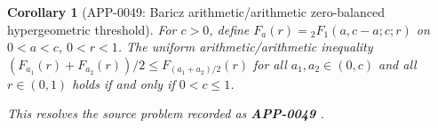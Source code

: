 \documentclass[11pt]{article}
\numberwithin{equation}{section}
\newtheorem{corollary}[theorem]{Corollary}
\theoremstyle{definition}
\theoremstyle{remark}
\newcommand{\1}{\mathbf 1}
\begin{document}
\begin{corollary}[APP-0049: Baricz arithmetic/arithmetic zero-balanced hypergeometric threshold]
\label{res:baricz-aa-zero-balanced-concavity-threshold}
For \(c>0\), define \(F_a(r)={}_2F_1(a,c-a;c;r)\) on \(0<a<c\), \(0<r<1\). The uniform arithmetic/arithmetic inequality \((F_{a_1}(r)+F_{a_2}(r))/2\le F_{(a_1+a_2)/2}(r)\) for all \(a_1,a_2\in(0,c)\) and all \(r\in(0,1)\) holds if and only if \(0<c\le1\).



This resolves the source problem recorded as \textbf{APP-0049} \cite{app-app-0049-source}.
\end{corollary}
\end{document}
